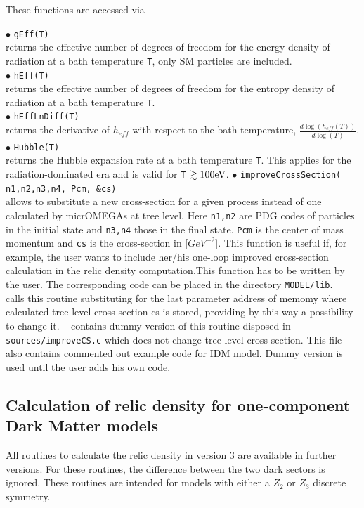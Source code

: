 \documentclass[12pt,a4paper]{article}
\begin{document}
These functions are accessed via

\noindent$\bullet$ \verb|gEff(T)|\\
 returns the effective number of degrees of freedom for the energy density of radiation at a bath temperature \verb|T|,   only SM particles are included.\\
\noindent$\bullet$ \verb|hEff(T)|\\ returns the effective number of degrees of freedom for the entropy density of radiation at a bath temperature \verb|T|.\\
\noindent$\bullet$ \verb|hEffLnDiff(T)|\\ returns the derivative of $h_{eff}$ with respect to the bath temperature, $\frac{d\log(h_{eff}(T))}{d\log(T)}$.\\
\noindent$\bullet$ \verb|Hubble(T)|\\ returns the Hubble expansion rate at a bath temperature \verb|T|. This applies for the radiation-dominated era and is valid for \verb|T| $\gtrsim 100 {\rm eV}$. 
%
\noindent$\bullet$ \verb|improveCrossSection( n1,n2,n3,n4, Pcm, &cs)|\\
allows to substitute a new cross-section for a given process instead of one calculated by
micrOMEGAs at tree level.  Here \verb|n1,n2| are PDG codes  of particles in the initial state and
\verb|n3,n4| those in the final state. \verb|Pcm| is the center of mass momentum and \verb|cs| is the cross-section in
[$GeV^{-2}$]. This function is useful if, for example, the user wants to include her/his one-loop improved cross-section 
calculation in the relic density computation.This function has to be written by the user. 
The corresponding code can be placed in the directory \verb|MODEL/lib|. \micro~   calls this routine substituting
for the last parameter address of memomy where calculated tree level cross section cs is stored,
providing by this way a possibility to change it.
 \micro~  contains dummy version of this routine  disposed in 
\verb|sources/improveCS.c| which does  not change tree level   cross section. This file also  contains
commented out example code for IDM model. Dummy version is used until the user adds   his own code. 


\subsection{Calculation of relic density for one-component Dark Matter models}
\label{sec:one_component}
All routines to calculate the relic density in  version 3 are  available in further versions. For these routines,  the difference between 
the two dark sectors is ignored. These routines are intended for models with either a $Z_2$ or $Z_3$ discrete symmetry.
  
\end{document}
